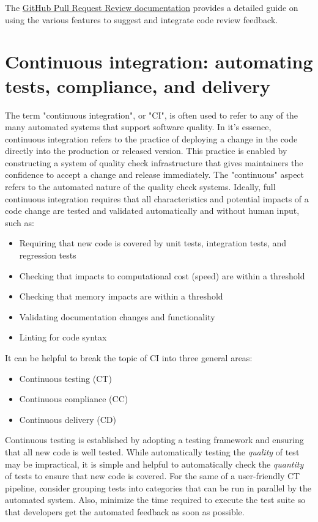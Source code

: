 \documentclass[]{nrel}
\begin{document}
The \href{https://docs.github.com/en/pull-requests/collaborating-with-pull-requests/reviewing-changes-in-pull-requests/incorporating-feedback-in-your-pull-request}{GitHub Pull Request Review documentation}
provides a detailed guide on using the various features to suggest and integrate
code review feedback.


\section{Continuous integration: automating tests, compliance, and delivery}
\label{sec:continuous}

The term "continuous integration", or "CI", is often used to refer to any of the many
automated systems that support software quality.
In it's essence, continuous integration refers to the practice of deploying a change in
the code directly into the production or released version.
This practice is enabled by constructing a system of quality check infrastructure that gives
maintainers the confidence to accept a change and release immediately.
The "continuous" aspect refers to the automated nature of the quality check systems.
Ideally, full continuous integration requires that all characteristics and potential
impacts of a code change are tested and validated automatically and without human
input, such as:
\begin{itemize}
\item Requiring that new code is covered by unit tests, integration tests, and regression tests
\item Checking that impacts to computational cost (speed) are within a threshold
\item Checking that memory impacts are within a threshold
\item Validating documentation changes and functionality
\item Linting for code syntax
\end{itemize}

It can be helpful to break the topic of CI into three general areas:
\begin{itemize}
\item Continuous testing (CT)
\item Continuous compliance (CC)
\item Continuous delivery (CD)
\end{itemize}

Continuous testing is established by adopting a testing framework and ensuring that all
new code is well tested. While automatically testing the \textit{quality} of test may be impractical,
it is simple and helpful to automatically check the \textit{quantity} of tests to ensure that new
code is covered.
For the same of a user-friendly CT pipeline, consider grouping tests into categories
that can be run in parallel by the automated system.
Also, minimize the time required to execute the test suite so that developers get
the automated feedback as soon as possible.
\end{document}
